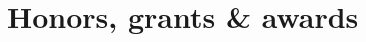 \documentclass[letterpaper]{article}
\begin{document}











\section*{Honors, grants \& awards}
\end{document}
